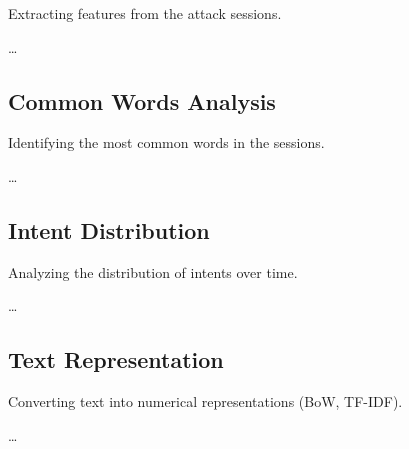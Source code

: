         Extracting features from the attack sessions.

        \ldots

    \subsection{Common Words Analysis}
    
        Identifying the most common words in the sessions.

        \ldots

    \subsection{Intent Distribution}
            
        Analyzing the distribution of intents over time.

        \ldots

    \subsection{Text Representation}
    
        Converting text into numerical representations (BoW, TF-IDF).

        \ldots
